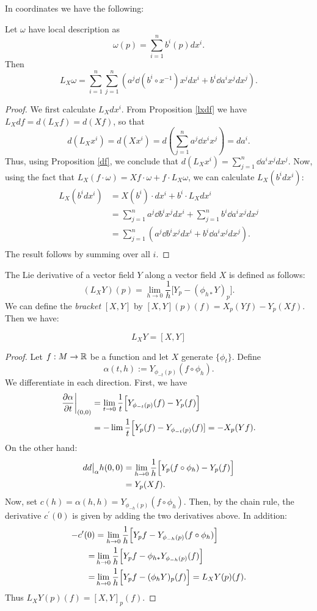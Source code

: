 \documentclass[11pt, english]{article}
\begin{document}
In coordinates we have the following:
\begin{prop}
Let $\omega$ have local description as 
\[
\omega(p) = \sum_{i=1}^n b^i(p) dx^i.
\]
Then
\[
L_X \omega  = \sum_{i=1}^n \sum_{j=1}^n \left( a^j \dd{(b^i \circ x^{-1})}{x^j} dx^i + b^i \dd{a^i}{x^j} dx^j \right).
\]
\end{prop}
\begin{proof}
We first calculate $L_X dx^i$. From Proposition \ref{lxdf} we have $L_X df = d(L_Xf)=d(Xf)$, so that
\[
d(L_X x^i) = d(X x^i) = d\left(\sum_{j=1}^n a^j \dd{x^i}{x^j}\right) = d a^i.
\]
Thus, using Proposition \ref{df}, we conclude that $d(L_X x^i)= \sum_{j=1}^n \dd{a^i}{x^j} dx^j$. Now, using the fact that $L_X (f \cdot \omega) = Xf \cdot \omega + f \cdot L_X \omega$, we can calculate $L_X(b^i dx^i)$:
\begin{align*}
L_X(b^i dx^i) &= X(b^i) \cdot dx^i + b^i \cdot L_X dx^i \\
&= \sum_{j=1}^n a^j \dd{b^i}{x^j} dx^i + \sum_{j=1}^n b^i \dd{a^i}{x^j} dx^j \\
&= \sum_{j=1}^n \left( a^j \dd{b^i}{x^j} dx^i +  b^i \dd{a^i}{x^j} dx^j\right). \\
\end{align*}
The result follows by summing over all $i$.
\end{proof}

The Lie derivative of a vector field $Y$ along a vector field $X$ is defined as follows:
\[
(L_X Y)(p) = \lim_{h \to 0} \frac 1h \bigl[ Y_p - (\phi_{h \ast} Y)_p \bigr].
\]
We can define the \emph{bracket} $[X,Y]$ by $[X,Y](p)(f)=X_p(Yf)-Y_p(Xf)$. Then we have:
\begin{prop}
\[L_X Y = [X,Y]\]
\end{prop}
\begin{proof}
Let $f:M \to \mathbb{R}$ be a function and let $X$ generate $\{ \phi_t \}$. Define
\[
\alpha (t,h) := Y_{\phi_{-t}(p)}(f \circ \phi_h).
\]
We differentiate in each direction. First, we have
\begin{align*}
\restr{\dd{\alpha}{t}}{(0,0)} &= \lim_{t \to 0} \frac 1t \Bigl[ Y_{\phi_{-t}(p)}(f)-Y_p(f) \Bigr] \\
&= -\lim \frac 1t \Bigl [ Y_p(f) - Y_{\phi_{-t}(p)}(f)] = -X_p(Yf).
\end{align*}
On the other hand:
\begin{align*}
\restr{dd}{\alpha}{h}{(0,0)} &= \lim_{h \to 0} \frac 1h \Bigl[ Y_p(f \circ \phi_h) - Y_p(f) \Bigr] \\
&= Y_p(Xf). 
\end{align*}
Now, set $c(h)= \alpha(h,h)=Y_{\phi_{-h}(p)}(f \circ \phi_h)$. Then, by the chain rule, the derivative $c^\prime(0)$ is given by adding the two derivatives above. In addition:
\begin{align*}
-c^\prime(0) &= \lim_{h \to 0} \frac 1h \Bigl[Y_pf -  Y_{\phi_{-h}(p)}(f \circ \phi_h)\Bigr] \\
=& \lim_{h \to 0} \frac 1h \Bigl [Y_pf -\phi_{h \ast}Y_{\phi_{-h}(p)}(f)\Bigr] \\
=& \lim_{h \to 0} \frac 1h \Bigl [Y_pf -(\phi_hY)_p(f)\Bigr]=L_XY(p)(f).
\end{align*}
Thus $L_XY(p)(f) = [X,Y]_p(f)$.
\end{proof}
\end{document}
